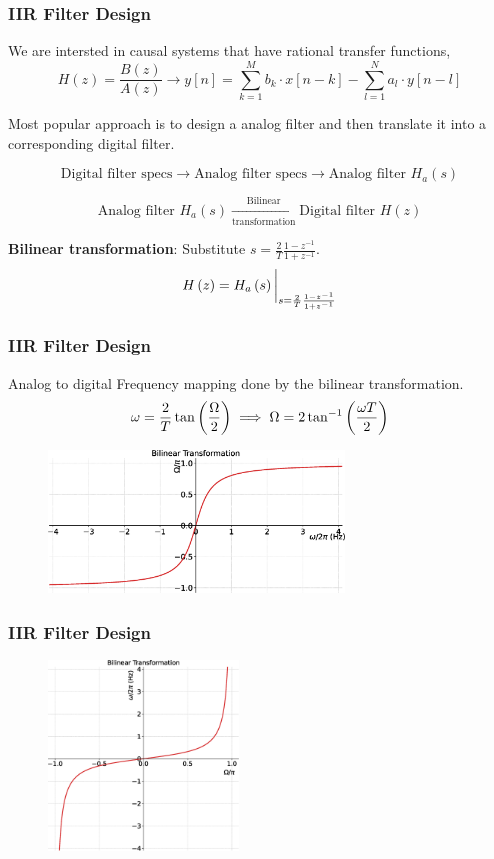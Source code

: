 \documentclass[aspectratio=169]{beamer}
\def\lp{\ensuremath\left(}
\def\rp{\ensuremath\right)}
\begin{document}
\begin{frame}[t]
  \frametitle{IIR Filter Design}

  We are intersted in causal systems that have rational transfer functions,
  \[ H(z) = \frac{B(z)}{A(z)} \longrightarrow y[n] = \sum_{k=1}^M b_k \cdot x[n - k] - \sum_{l=1}^N a_l \cdot y[n - l] \] 
  
  Most popular approach is to design a analog filter and then translate it into a corresponding digital filter.

  \[ \text{Digital filter specs} \longrightarrow \text{Analog filter specs} \longrightarrow \text{Analog filter } H_a(s) \]

  \[ \text{Analog filter } H_a(s) \xrightarrow[\text{transformation}]{\text{Bilinear}} \text{Digital filter } H(z) \]

  \textbf{Bilinear transformation}: Substitute $s = \frac{2}{T}\frac{1 - z^{-1}}{1 + z^{-1}}$.
  \[ H\lp z \rp = H_a\lp s \rp \bigg\vert_{s = \frac{2}{T}\frac{1 - z^{-1}}{1 + z^{-1}}} \]
\end{frame}


\begin{frame}[t]
  \frametitle{IIR Filter Design}

  Analog to digital Frequency mapping done by the bilinear transformation.
  \[ \omega = \frac{2}{T} \tan \lp \frac{\Omega}{2} \rp \implies  \Omega = 2 \tan^{-1} \lp \frac{\omega T}{2} \rp \]

  \begin{figure}
  \centering
  \includegraphics[width=0.7\textwidth]{img/bilintrans.eps}
  \end{figure}
\end{frame}


\begin{frame}[t]
  \frametitle{IIR Filter Design}
  \begin{figure}
  \centering
  \includegraphics[width=0.45\textwidth]{img/bilintransinv.eps}
  \end{figure}
\end{frame}
\end{document}
